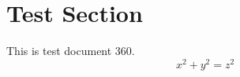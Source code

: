 \documentclass{article}
\begin{document}
\section{Test Section}
This is test document 360.
\begin{equation}
x^2 + y^2 = z^2
\end{equation}
\end{document}
